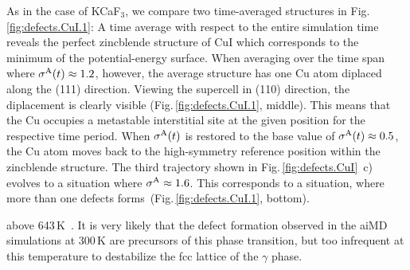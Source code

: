 %
As in the case of KCaF$_3$, we compare two time-averaged structures in Fig.\,\ref{fig:defects.CuI.1}: A time average with respect to the entire simulation time reveals the perfect zincblende structure of CuI which corresponds to the minimum of the potential-energy surface.
When averaging over the time span where $\sigma^\mathrm{A} (t) \approx 1.2$, however, the average structure has one Cu atom diplaced along the (111) direction. Viewing the supercell in (110) direction, the diplacement is clearly visible (Fig.\,\ref{fig:defects.CuI.1}, middle). This means that the Cu occupies a metastable interstitial site at the given position for the respective time period. When $\sigma^\mathrm{A} (t)$ is restored to the base value of $\sigma^\mathrm{A} (t) \approx 0.5$, the Cu atom moves back to the high-symmetry reference position within the zincblende structure. 
The third trajectory shown in Fig.\,\ref{fig:defects.CuI}~c) evolves to a situation where $\sigma^\mathrm{A} \approx 1.6$. This corresponds to a situation, where more than one defects forms~(Fig.\,\ref{fig:defects.CuI.1}, bottom).

 above 643\,K~\cite{Boyce.1979, Boyce.1980,Boyce.1981,Keen.1995}. It is very likely that the defect formation observed in the aiMD simulations at 300\,K are precursors of this phase transition, but too infrequent at this temperature to destabilize the fcc lattice of the $\gamma$ phase.

